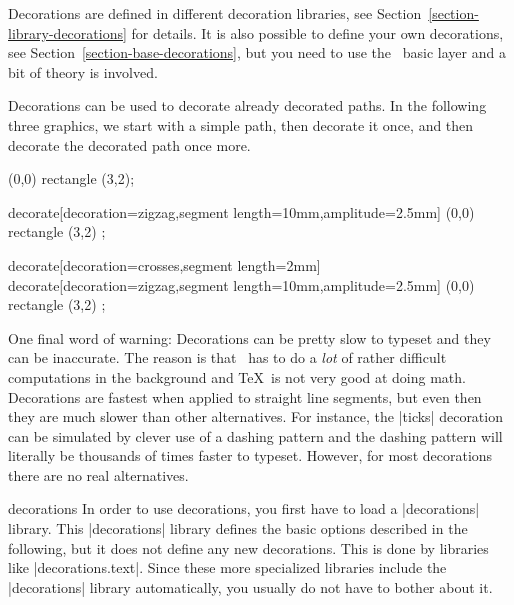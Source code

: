 Decorations are defined in different decoration libraries, see
Section~\ref{section-library-decorations} for details. It is also possible to
define your own decorations, see Section~\ref{section-base-decorations}, but
you need to use the \pgfname\ basic layer and a bit of theory is involved.

Decorations can be used to decorate already decorated paths. In the following
three graphics, we start with a simple path, then decorate it once, and then
decorate the decorated path once more.
%
\begin{codeexample}[]
\tikz \fill [fill=blue!20,draw=blue,thick]
  (0,0) rectangle (3,2);
\end{codeexample}
%
\begin{codeexample}[preamble={\usetikzlibrary{decorations.pathmorphing}}]
\tikz \fill [fill=blue!20,draw=blue,thick]
  decorate[decoration={zigzag,segment length=10mm,amplitude=2.5mm}]
    { (0,0) rectangle (3,2) };
\end{codeexample}
%
\begin{codeexample}[preamble={\usetikzlibrary{
    decorations.pathmorphing,
    decorations.shapes,
}}]
\tikz \fill [fill=blue!20,draw=blue,thick]
  decorate[decoration={crosses,segment length=2mm}] {
    decorate[decoration={zigzag,segment length=10mm,amplitude=2.5mm}] {
      (0,0) rectangle (3,2)
    }
  };
\end{codeexample}

One final word of warning: Decorations can be pretty slow to typeset and they
can be inaccurate. The reason is that \pgfname\ has to do a \emph{lot} of rather
difficult computations in the background and \TeX\ is not very good at doing
math. Decorations are fastest when applied to straight line segments, but even
then they are much slower than other alternatives. For instance, the |ticks|
decoration can be simulated by clever use of a dashing pattern and the dashing
pattern will literally be thousands of times faster to typeset. However, for
most decorations there are no real alternatives.

\begin{tikzlibrary}{decorations}
    In order to use decorations, you first have to load a |decorations| library.
    This |decorations| library defines the basic options described in the
    following, but it does not define any new decorations. This is done by
    libraries like |decorations.text|. Since these more specialized libraries
    include the |decorations| library automatically, you usually do not have to
    bother about it.
\end{tikzlibrary}


